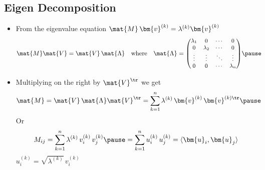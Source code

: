 \begin{slide}
\section[-2]{Eigen Decomposition}

\begin{PauseHighLight}\squeeze
  \begin{itemize}
  \item From the eigenvalue equation $\mat{M} \, \bm{v}^{(k)} = \lambda^{(k)}
    \bm{v}^{(k)}$
     \vspace*{-0.5em}
    \begin{align*}
      \mat{M} \mat{V} &= \mat{V} \, \mat{\Lambda} & \mbox{where}\quad
      \mat{\Lambda} &= {\small
      \begin{pmatrix}
        \lambda_1 & 0 & \cdots & 0 \\
        0 & \lambda_2 & \cdots & 0 \\
        \vdots & \vdots & \ddots & \vdots \\
        0 & 0 & \cdots & \lambda_n
      \end{pmatrix}}\pause
    \end{align*}                         \vspace*{-2em}
  \item Multiplying on the right by $\mat{V}^\tr$ we get
    \begin{align*}
      \mat{M} &= \mat{V} \, \mat{\Lambda} \mat{V}^\tr = \sum_{k=1}^n
      \lambda^{(k)}\, \bm{v}^{(k)}\, \bm{v}^{(k)\tr}\pause 
    \end{align*}
    Or \vspace*{-1em}
    \begin{align*}
      M_{ij} = \sum_{k=1}^n \lambda^{(k)}\, v^{(k)}_i\, v^{(k)}_j
      \pause = \sum_{k=1}^n u^{(k)}_i\, u^{(k)}_j = \langle \bm{u}_i, \bm{u}_j \rangle
    \end{align*}
    $u^{(k)}_i = \sqrt{\lambda^{(k)}}\,v^{(k)}_i$\pauseb
  \end{itemize}
\end{PauseHighLight}

\end{slide}


